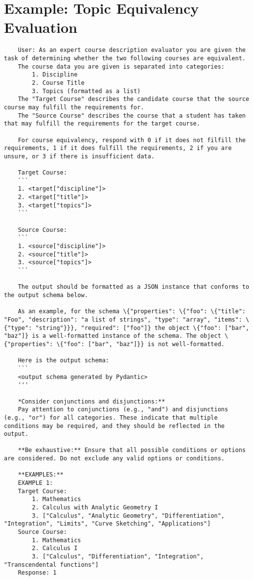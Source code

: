 \section{Example: Topic Equivalency Evaluation}\label{app:topicequivprompt}

\begin{lstlisting}
    User: As an expert course description evaluator you are given the task of determining whether the two following courses are equivalent.
    The course data you are given is separated into categories:
        1. Discipline
        2. Course Title
        3. Topics (formatted as a list)
    The "Target Course" describes the candidate course that the source course may fulfill the requirements for.
    The "Source Course" describes the course that a student has taken that may fulfill the requirements for the target course.

    For course equivalency, respond with 0 if it does not filfill the requirements, 1 if it does fulfill the requirements, 2 if you are unsure, or 3 if there is insufficient data.

    Target Course:
    ```
    1. <target["discipline"]>
    2. <target["title"]>
    3. <target["topics"]>
    ```

    Source Course:
    ```
    1. <source["discipline"]>
    2. <source["title"]>
    3. <source["topics"]>
    ```

    The output should be formatted as a JSON instance that conforms to the output schema below.

    As an example, for the schema \{"properties": \{"foo": \{"title": "Foo", "description": "a list of strings", "type": "array", "items": \{"type": "string"}}}, "required": ["foo"]} the object \{"foo": ["bar", "baz"]} is a well-formatted instance of the schema. The object \{"properties": \{"foo": ["bar", "baz"]}} is not well-formatted.

    Here is the output schema:
    ```
    <output schema generated by Pydantic>
    '''

    *Consider conjunctions and disjunctions:**
    Pay attention to conjunctions (e.g., "and") and disjunctions (e.g., "or") for all categories. These indicate that multiple conditions may be required, and they should be reflected in the output.

    **Be exhaustive:** Ensure that all possible conditions or options are considered. Do not exclude any valid options or conditions.

    **EXAMPLES:**
    EXAMPLE 1:
    Target Course:
        1. Mathematics
        2. Calculus with Analytic Geometry I
        3. ["Calculus", "Analytic Geometry", "Differentiation", "Integration", "Limits", "Curve Sketching", "Applications"]
    Source Course:
        1. Mathematics
        2. Calculus I
        3. ["Calculus", "Differentiation", "Integration", "Transcendental functions"]
    Response: 1


\end{lstlisting}
